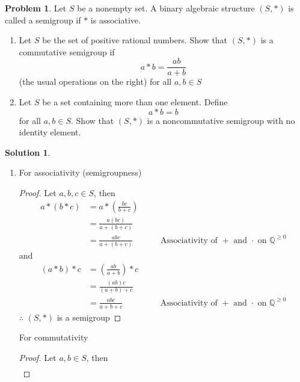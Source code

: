\documentclass[10pt]{article}
\theoremstyle{definition}
\newtheorem{problem}{Problem}
\newtheorem{soln}{Solution}
\newcommand{\justif}[2]{&{#1}&\text{#2}}
\begin{document}
\begin{problem}
Let $S$ be a nonempty set. A binary algebraic structure $(S, *)$ is called
a semigroup if $*$ is associative.
\begin{enumerate}[label=(\alph*)]
  \item Let $S$ be the set of positive rational numbers. Show that $(S, *)$
        is a commutative semigroup if
        $$a*b=\frac{ab}{a+b}$$
        (the usual operations on the right) for all $a,b\in S$
  \item Let $S$ be a set containing more than one element. Define
        $$a*b=b$$
        for all $a,b\in S$. Show that $(S,*)$ is a noncommutative semigroup with no identity element.
\end{enumerate}
\end{problem}
\begin{soln}
  \begin{enumerate}[label=(\alph*)]
    \item For associativity (semigroupness)
          \begin{proof}
            Let $a,b,c\in S$, then
            \begin{align*}
              a*(b*c) & = a*\left(\frac{bc}{b+c}\right)                                                                \\
                      & = \frac{a(bc)}{a+(b+c)}                                                                        \\
                      & = \frac{abc}{a+(b+c)} \justif{\quad}{Associativity of $+$ and $\cdot$ on $\mathbb{Q}^{\geq0}$}
            \end{align*}
            and
            \begin{align*}
              (a*b)*c & = \left(\frac{ab}{a+b}\right)*c                                                               \\
                      & = \frac{(ab)c}{(a+b)+c}                                                                       \\
                      & = \frac{abc}{a+b+c}  \justif{\quad}{Associativity of $+$ and $\cdot$ on $\mathbb{Q}^{\geq0}$}
            \end{align*}
            $\therefore$ $(S, *)$ is a semigroup\qedhere
          \end{proof}
          For commutativity
          \begin{proof}
            Let $a,b\in S$, then
            \begin{align*}

\end{align*}
\end{proof}
\end{enumerate}
\end{soln}
\end{document}
